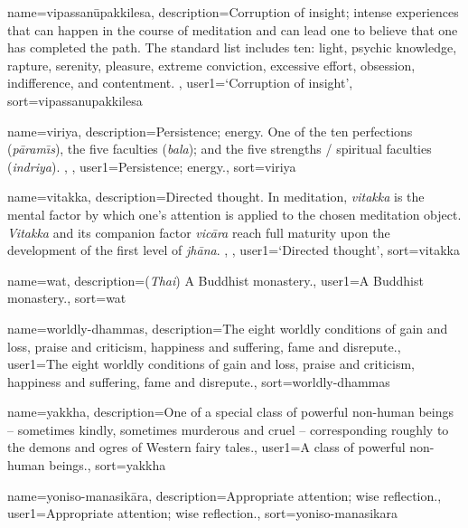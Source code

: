 {
name={vipassan\=upakkilesa},
description={Corruption of insight; intense experiences that can happen in the course of meditation and can lead one to believe that one has completed the path. The standard list includes ten: light, psychic knowledge, rapture, serenity, pleasure, extreme conviction, excessive effort, obsession, indifference, and contentment. \protect \seepre %
\protect {}%
\protect \seepost %
},
user1={`Corruption of insight'},
sort={vipassanupakkilesa}
}

{
name={viriya},
description={Persistence; energy. One of the ten perfections (\textit{p\=aram\={\i}s}), the five faculties (\textit{bala}); and the five strengths / spiritual faculties (\textit{indriya}). \protect \seepre %
\protect {}, \protect {}%
\protect \seepost %
},
user1={Persistence; energy.},
sort={viriya}
}

{
name={vitakka},
description={Directed thought. In meditation, \textit{vitakka} is the mental factor by which one's attention is applied to the chosen meditation object. \textit{Vitakka} and its companion factor \textit{vic\=ara} reach full maturity upon the development of the first level of \textit{jh\=ana}. \protect \seepre %
\protect {}, \protect {}%
\protect \seepost %
},
user1={`Directed thought'},
sort={vitakka}
}

{
name=wat,
description={(\textit{Thai}) A Buddhist monastery.},
user1={A Buddhist monastery.},
sort={wat}
}

{
name=worldly-dhammas,
description={The eight worldly conditions of gain and loss, praise and criticism, happiness and suffering, fame and disrepute.},
user1={The eight worldly conditions of gain and loss, praise and criticism, happiness and suffering, fame and disrepute.},
sort={worldly-dhammas}
}

{
name={yakkha},
description={One of a special class of powerful non-human beings -- sometimes kindly, sometimes murderous and cruel -- corresponding roughly to the demons and ogres of Western fairy tales.},
user1={A class of powerful non-human beings.},
sort={yakkha}
}

{
name=yoniso-manasik\=ara,
description={Appropriate attention; wise reflection.},
user1={Appropriate attention; wise reflection.},
sort={yoniso-manasikara}
}

